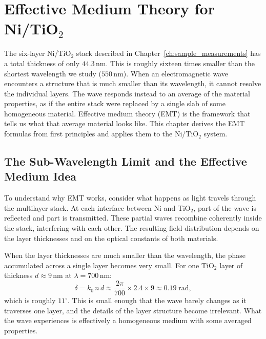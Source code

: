 
\chapter{Effective Medium Theory for Ni/TiO$_2$}
\label{ch:emt}

The six-layer Ni/TiO$_2$ stack described in Chapter~\ref{ch:sample_measurements}
has a total thickness of only $44.3$\,nm. This is roughly sixteen times smaller
than the shortest wavelength we study ($550$\,nm). When an electromagnetic wave
encounters a structure that is much smaller than its wavelength, it cannot
resolve the individual layers. The wave responds instead to an average of the
material properties, as if the entire stack were replaced by a single slab of
some homogeneous material. Effective medium theory (EMT) is the framework that
tells us what that average material looks like. This chapter derives the EMT
formulas from first principles and applies them to the Ni/TiO$_2$ system.

\section{The Sub-Wavelength Limit and the Effective Medium Idea}

To understand why EMT works, consider what happens as light travels through the
multilayer stack. At each interface between Ni and TiO$_2$, part of the wave is
reflected and part is transmitted. These partial waves recombine coherently
inside the stack, interfering with each other. The resulting field distribution
depends on the layer thicknesses and on the optical constants of both materials.

When the layer thicknesses are much smaller than the wavelength, the phase
accumulated across a single layer becomes very small. For one TiO$_2$ layer of
thickness $d \approx 9$\,nm at $\lambda = 700$\,nm:
\begin{equation}
  \delta = k_0\,n\,d \approx \frac{2\pi}{700}\times 2.4\times 9
  \approx 0.19\;\text{rad},
  \label{eq:ch3_phase_per_layer}
\end{equation}
which is roughly $11^\circ$. This is small enough that the wave barely changes
as it traverses one layer, and the details of the layer structure become
irrelevant. What the wave experiences is effectively a homogeneous medium with
some averaged properties.

